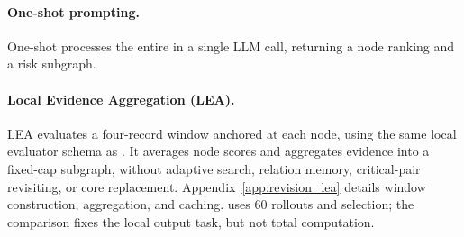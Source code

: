 \paragraph{One-shot prompting.}
One-shot processes the entire \scc{} in a single LLM call, returning a node ranking and a risk subgraph.


\paragraph{Local Evidence Aggregation (LEA).}
LEA evaluates a four-record window anchored at each \scc{} node, using the same local evaluator schema as \samcgs{}. It averages node scores and aggregates evidence into a fixed-cap subgraph, without adaptive search, relation memory, critical-pair revisiting, or core replacement. Appendix~\ref{app:revision_lea} details window construction, aggregation, and caching. \samcgs{} uses 60 rollouts and  selection; the comparison fixes the local output task, but not total computation.
